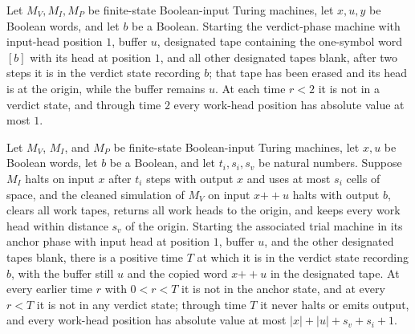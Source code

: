 \begin{theorem}
\label{Complexity.b2b_trial_verdict}
\leanok
{}
Let $M_V,M_I,M_P$ be finite-state Boolean-input Turing machines, let $x,u,y$ be Boolean
words, and let $b$ be a Boolean. Starting the verdict-phase machine with input-head
position $1$, buffer $u$, designated tape containing the one-symbol word $[b]$ with its
head at position $1$, and all other designated tapes blank, after two steps it is in the
verdict state recording $b$; that tape has been erased and its head is at the origin,
while the buffer remains $u$. At each time $r<2$ it is not in a verdict state, and
through time $2$ every work-head position has absolute value at most $1$.
\end{theorem}

\begin{theorem}
\label{Complexity.b2b_trial_run}
\leanok
{}
Let $M_V$, $M_I$, and $M_P$ be finite-state Boolean-input Turing machines, let $x,u$ be
Boolean words, let $b$ be a Boolean, and let $t_i,s_i,s_v$ be natural numbers. Suppose
$M_I$ halts on input $x$ after $t_i$ steps with output $x$ and uses at most $s_i$ cells
of space, and the cleaned simulation of $M_V$ on input $x\mathbin{++}u$ halts with
output $b$, clears all work tapes, returns all work heads to the origin, and keeps every
work head within distance $s_v$ of the origin. Starting the associated trial machine in
its anchor phase with input head at position $1$, buffer $u$, and the other designated
tapes blank, there is a positive time $T$ at which it is in the verdict state recording
$b$, with the buffer still $u$ and the copied word $x\mathbin{++}u$ in the designated
tape. At every earlier time $r$ with $0<r<T$ it is not in the anchor state, and at every
$r<T$ it is not in any verdict state; through time $T$ it never halts or emits output,
and every work-head position has absolute value at most $|x|+|u|+s_v+s_i+1$.
\end{theorem}

